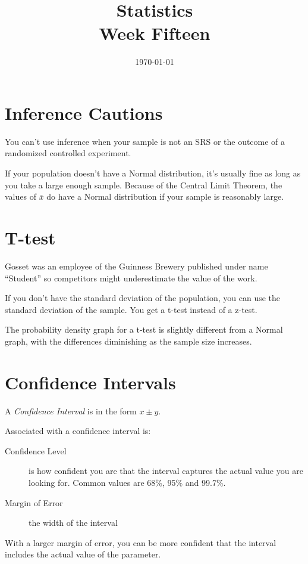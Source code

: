 \documentclass[letterpaper, landscape]{exam}
\title{Statistics \\ Week Fifteen}
\date{\today}
\author{}
\begin{document}
  \maketitle
  \tableofcontents

  \section{Inference Cautions}
  You can't use inference when your sample is not an SRS or the outcome of a
  randomized controlled experiment.

  If your population doesn't have a Normal distribution, it's usually fine as
  long as you take a large enough sample. Because of the Central Limit Theorem,
  the values of $\bar{x}$ do have a Normal distribution if your sample is
  reasonably large.

  \section{T-test}
  Gosset was an employee of the Guinness Brewery published under name
  ``Student'' so competitors might underestimate the value of the work.

  If you don't have the standard deviation of the population, you can use the
  standard deviation of the sample. You get a t-test instead of a z-test.

  The probability density graph for a t-test is slightly different from a Normal
  graph, with the differences diminishing as the sample size increases.

  \section{Confidence Intervals}
  A {\em Confidence Interval\/} is in the form $x \pm y$.

  Associated with a confidence interval is:
  \begin{description}
    \item[Confidence Level] is how confident you are that the interval
      captures the actual value you are looking for. Common values are 68\%,
      95\% and 99.7\%.

    \item[Margin of Error] the width of the interval
  \end{description}

  With a larger margin of error, you can be more confident that the interval
  includes the actual value of the parameter.
\end{document}
